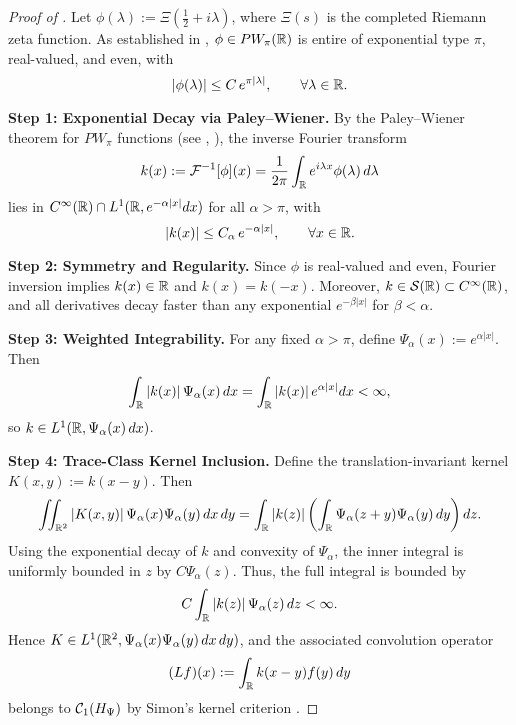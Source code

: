 \begin{proof}[Proof of ]
Let \( \phi(\lambda) := \Xi\left( \tfrac{1}{2} + i\lambda \right) \), where \( \Xi(s) \) is the completed Riemann zeta function. As established in , \( \phi \in PW_\pi(\mathbb{R}) \) is entire of exponential type \( \pi \), real-valued, and even, with
\[
|\phi(\lambda)| \le C\, e^{\pi |\lambda|}, \qquad \forall \lambda \in \mathbb{R}.
\]

\medskip
\noindent\textbf{Step 1: Exponential Decay via Paley--Wiener.}
By the Paley--Wiener theorem for \( PW_\pi \) functions (see \cite[Thm.~3.2.4]{Levin1996EntireLectures}, \cite[Ch.~IX.4]{ReedSimon1975II}), the inverse Fourier transform
\[
k(x) := \mathcal{F}^{-1}[\phi](x) = \frac{1}{2\pi} \int_{\mathbb{R}} e^{i\lambda x} \phi(\lambda)\, d\lambda
\]
lies in \( C^\infty(\mathbb{R}) \cap L^1(\mathbb{R}, e^{-\alpha |x|} dx) \) for all \( \alpha > \pi \), with
\[
|k(x)| \le C_\alpha\, e^{-\alpha |x|}, \qquad \forall x \in \mathbb{R}.
\]

\medskip
\noindent\textbf{Step 2: Symmetry and Regularity.}
Since \( \phi \) is real-valued and even, Fourier inversion implies \( k(x) \in \mathbb{R} \) and \( k(x) = k(-x) \). Moreover, \( k \in \mathcal{S}(\mathbb{R}) \subset C^\infty(\mathbb{R}) \), and all derivatives decay faster than any exponential \( e^{-\beta |x|} \) for \( \beta < \alpha \).

\medskip
\noindent\textbf{Step 3: Weighted Integrability.}
For any fixed \( \alpha > \pi \), define \( \Psi_\alpha(x) := e^{\alpha |x|} \). Then
\[
\int_{\mathbb{R}} |k(x)|\, \Psi_\alpha(x)\, dx = \int_{\mathbb{R}} |k(x)|\, e^{\alpha |x|} dx < \infty,
\]
so \( k \in L^1(\mathbb{R}, \Psi_\alpha(x)\, dx) \).

\medskip
\noindent\textbf{Step 4: Trace-Class Kernel Inclusion.}
Define the translation-invariant kernel \( K(x,y) := k(x - y) \). Then
\[
\iint_{\mathbb{R}^2} |K(x,y)|\, \Psi_\alpha(x)\Psi_\alpha(y)\, dx\, dy
= \int_{\mathbb{R}} |k(z)| \left( \int_{\mathbb{R}} \Psi_\alpha(z + y)\Psi_\alpha(y)\, dy \right) dz.
\]
Using the exponential decay of \( k \) and convexity of \( \Psi_\alpha \), the inner integral is uniformly bounded in \( z \) by \( C \Psi_\alpha(z) \). Thus, the full integral is bounded by
\[
C \int_{\mathbb{R}} |k(z)|\, \Psi_\alpha(z)\, dz < \infty.
\]
Hence \( K \in L^1(\mathbb{R}^2, \Psi_\alpha(x)\Psi_\alpha(y)\, dx\, dy) \), and the associated convolution operator
\[
(Lf)(x) := \int_{\mathbb{R}} k(x - y) f(y)\, dy
\]
belongs to \( \mathcal{C}_1(H_{\Psi}) \) by Simon’s kernel criterion \cite[Thm.~4.2]{Simon2005TraceIdeals}.
\end{proof}
